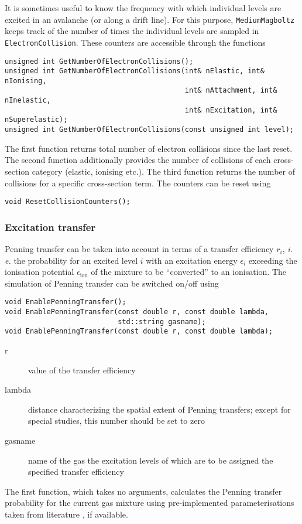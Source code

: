 It is sometimes useful to know the frequency with which individual levels 
are excited in an avalanche (or along a drift line). 
For this purpose, \texttt{MediumMagboltz} keeps track of the number of times 
the individual levels are sampled in \texttt{ElectronCollision}. 
These counters are accessible through the functions
\begin{lstlisting}
unsigned int GetNumberOfElectronCollisions();
unsigned int GetNumberOfElectronCollisions(int& nElastic, int& nIonising, 
                                           int& nAttachment, int& nInelastic, 
                                           int& nExcitation, int& nSuperelastic);
unsigned int GetNumberOfElectronCollisions(const unsigned int level);
\end{lstlisting}
The first function returns total number of electron collisions 
since the last reset. 
The second function additionally provides the number of collisions of each 
cross-section category (elastic, ionising etc.). 
The third function returns the number of collisions for a specific cross-section term.
The counters can be reset using
\begin{lstlisting}
void ResetCollisionCounters();
\end{lstlisting} 

\subsubsection{Excitation transfer}\label{Sec:PenningTransfer}

Penning transfer can be taken into account in terms of a transfer efficiency 
\(r_{i}\), \textit{i.\,e.} the probability for an excited level \(i\) with an  
excitation energy \(\epsilon_{i}\) exceeding the ionisation potential 
\(\epsilon_{\text{ion}}\) of the mixture to 
be ``converted'' to an ionisation.
The simulation of Penning transfer can be switched on/off using
\begin{lstlisting}
void EnablePenningTransfer();
void EnablePenningTransfer(const double r, const double lambda, 
                           std::string gasname);
void EnablePenningTransfer(const double r, const double lambda);
\end{lstlisting}
\begin{description}
  \item[r] value of the transfer efficiency
  \item[lambda] distance characterizing the spatial extent of Penning transfers; 
                except for special studies, this number should be set to zero
  \item[gasname] name of the gas the excitation levels of which are to be assigned 
                 the specified transfer efficiency 
\end{description}
The first function, which takes no arguments, 
calculates the Penning transfer probability for the current gas mixture
using pre-implemented parameterisations taken from literature 
\cite{Sahin2010,Sahin2017,Sahin2018,Sahin2021}, if available. 

